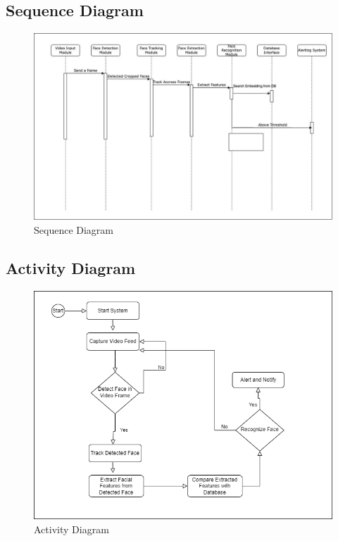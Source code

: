 	\pagebreak

	\subsection{Sequence Diagram}
		\begin{figure}[h!]
			\includegraphics[width=\textwidth]{components/images/sequence.jpeg}
			\caption{Sequence Diagram}
			\label{fig:sequence}
		\end{figure}

	\pagebreak

	\subsection{Activity Diagram}
		\begin{figure}[h!]
			\includegraphics[width=\textwidth]{components/images/activity.png}
			\caption{Activity Diagram}
			\label{fig:activity}
		\end{figure}

